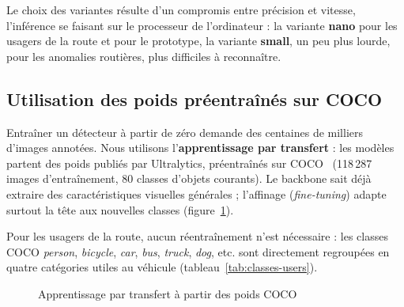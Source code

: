 Le choix des variantes résulte d'un compromis entre précision et vitesse, l'inférence se faisant sur le processeur
de l'ordinateur : la variante \textbf{nano} pour les usagers de la route et pour le prototype, la variante
\textbf{small}, un peu plus lourde, pour les anomalies routières, plus difficiles à reconnaître.

\subsection{Utilisation des poids préentraînés sur COCO}
Entraîner un détecteur à partir de zéro demande des centaines de milliers d'images annotées. Nous utilisons
l'\textbf{apprentissage par transfert} : les modèles partent des poids publiés par Ultralytics, préentraînés sur
COCO~\cite{lin2014coco} (118\,287 images d'entraînement, 80 classes d'objets courants). Le backbone sait déjà
extraire des caractéristiques visuelles générales ; l'affinage (\textit{fine-tuning}) adapte surtout la tête aux
nouvelles classes (figure~\ref{fig:transfert}).

Pour les usagers de la route, aucun réentraînement n'est nécessaire : les classes COCO \textit{person},
\textit{bicycle}, \textit{car}, \textit{bus}, \textit{truck}, \textit{dog}, etc. sont directement regroupées en quatre
catégories utiles au véhicule (tableau~\ref{tab:classes-users}).

\begin{figure}[H]
\centering
{}
\caption{Apprentissage par transfert à partir des poids COCO}
\label{fig:transfert}
\end{figure}

